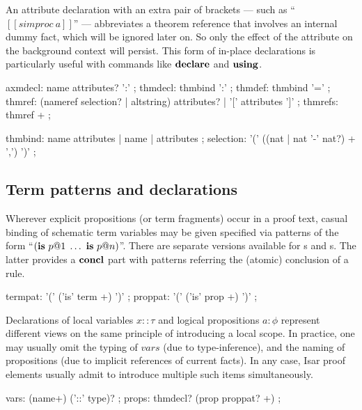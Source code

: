 An attribute declaration with an extra pair of brackets --- such as
``$[[simproc~a]]$'' --- abbreviates a theorem reference that involves
an internal dummy fact, which will be ignored later on.  So only the
effect of the attribute on the background context will persist.  This
form of in-place declarations is particularly useful with commands
like ${\mathord{\mathbf{declare}}}$ and ${\mathord{\mathbf{using}}}$.

\begin{rail}
  axmdecl: name attributes? ':'
  ;
  thmdecl: thmbind ':'
  ;
  thmdef: thmbind '='
  ;
  thmref: (nameref selection? | altstring) attributes? | '[' attributes ']'
  ;
  thmrefs: thmref +
  ;

  thmbind: name attributes | name | attributes
  ;
  selection: '(' ((nat | nat '-' nat?) + ',') ')'
  ;
\end{rail}


\subsection{Term patterns and declarations}\label{sec:term-decls}

Wherever explicit propositions (or term fragments) occur in a proof text,
casual binding of schematic term variables may be given specified via patterns
of the form ``$({\mathord{\mathbf{is}}}~p@1\;\dots~{\mathord{\mathbf{is}}}~p@n)$''.  There are separate versions
available for s and s.  The latter provides a
${\mathord{\mathbf{concl}}}$ part with patterns referring the (atomic) conclusion of a rule.

\begin{rail}
  termpat: '(' ('is' term +) ')'
  ;
  proppat: '(' ('is' prop +) ')'
  ;
\end{rail}

Declarations of local variables $x :: \tau$ and logical propositions $a :
\phi$ represent different views on the same principle of introducing a local
scope.  In practice, one may usually omit the typing of $vars$ (due to
type-inference), and the naming of propositions (due to implicit references of
current facts).  In any case, Isar proof elements usually admit to introduce
multiple such items simultaneously.

\begin{rail}
  vars: (name+) ('::' type)?
  ;
  props: thmdecl? (prop proppat? +)
  ;
\end{rail}

